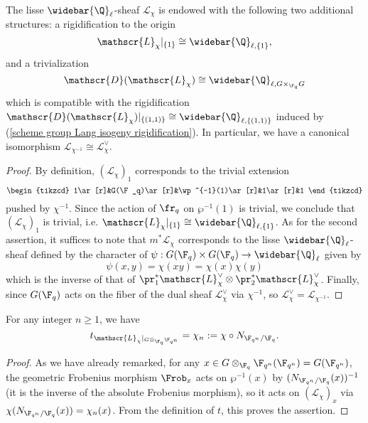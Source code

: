 \begin{proposition}\label{scheme group Lang isogeny structure prop}
The lisse $\widebar{\Q}_\ell$-sheaf $\mathscr{L}_\chi$ is endowed with the following two additional structures: a rigidification to the origin
\begin{equation}\label{scheme group Lang isogeny rigidification}
\mathscr{L}_\chi|_{\{1\}}\cong\widebar{\Q}_{\ell,\{1\}},
\end{equation}
and a trivialization
\begin{equation}\label{scheme group Lang isogeny trivialization}
\mathscr{D}(\mathscr{L}_\chi)\cong\widebar{\Q}_{\ell,G\times_{\F_q}G}
\end{equation}
which is compatible with the rigidification $\mathscr{D}(\mathscr{L}_\chi)|_{\{(1,1)\}}\cong\widebar{\Q}_{\ell,\{(1,1)\}}$ induced by (\ref{scheme group Lang isogeny rigidification}). In particular, we have a canonical isomorphism $\mathscr{L}_{\chi^{-1}}\cong\mathscr{L}_\chi^\vee$.
\end{proposition}
\begin{proof}
By definition, $(\mathscr{L}_{\chi})_1$ corresponds to the trivial extension
\[\begin{tikzcd}
1\ar[r]&G(\F_q)\ar[r]&\wp^{-1}(1)\ar[r]&1\ar[r]&1
\end{tikzcd}\]
pushed by $\chi^{-1}$. Since the action of $\fr_q$ on $\wp^{-1}(1)$ is trivial, we conclude that $(\mathscr{L}_{\chi})_1$ is trivial, i.e. $\mathscr{L}_\chi|_{\{1\}}\cong\widebar{\Q}_{\ell,\{1\}}$. As for the second assertion, it suffices to note that $m^*\mathscr{L}_\chi$ corresponds to the lisse $\widebar{\Q}_\ell$-sheaf defined by the character of $\psi:G(\F_q)\times G(\F_q)\to\widebar{\Q}_\ell$ given by
\[\psi(x,y)=\chi(xy)=\chi(x)\chi(y)\]
which is the inverse of that of $\pr_1^*\mathscr{L}_\chi^\vee\otimes\pr_2^*\mathscr{L}^\vee_\chi$. Finally, since $G(\F_q)$ acts on the fiber of the dual sheaf $\mathscr{L}_\chi^\vee$ via $\chi^{-1}$, so $\mathscr{L}_{\chi}^{\vee}=\mathscr{L}_{\chi^{-1}}$. 
\end{proof}

\begin{proposition}\label{scheme group Lang isogeny associated function char}
For any integer $n\geq 1$, we have
\begin{equation}
t_{\mathscr{L}_\chi|_{G\otimes_{\F_q}\F_{q^n}}}=\chi_n:=\chi\circ N_{\F_{q^n}/\F_q}.
\end{equation}
\end{proposition}
\begin{proof}
As we have already remarked, for any $x\in G\otimes_{\F_q}\F_{q^n}(\F_{q^n})=G(\F_{q^n})$, the geometric Frobenius morphism $\Frob_x$ acts on $\wp^{-1}(x)$ by $(N_{\F_{q^n}/\F_q}(x))^{-1}$ (it is the inverse of the absolute Frobenius morphism), so it acts on $(\mathscr{L}_{\chi})_x$ via $\chi(N_{\F_{q^n}/\F_q}(x))=\chi_n(x)$. From the definition of $t$, this proves the assertion.
\end{proof}

